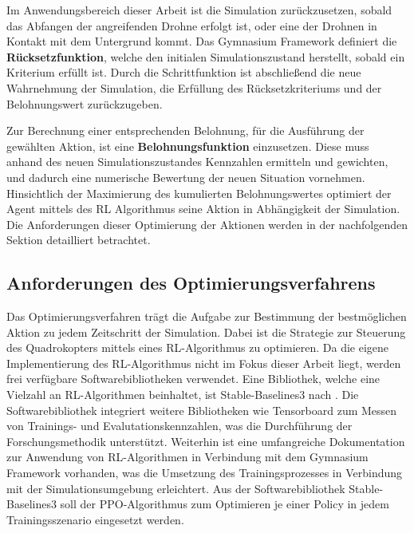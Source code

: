 Im Anwendungsbereich dieser Arbeit ist die Simulation zurückzusetzen, sobald das Abfangen der angreifenden Drohne erfolgt ist, oder eine der Drohnen in Kontakt mit dem Untergrund kommt.
Das Gymnasium Framework definiert die \textbf{Rücksetzfunktion}, welche den initialen Simulationszustand herstellt, sobald ein Kriterium erfüllt ist.
Durch die Schrittfunktion ist abschließend die neue Wahrnehmung der Simulation, die Erfüllung des Rücksetzkriteriums und der Belohnungswert zurückzugeben.

Zur Berechnung einer entsprechenden Belohnung, für die Ausführung der gewählten Aktion, ist eine \textbf{Belohnungsfunktion} einzusetzen.
Diese muss anhand des neuen Simulationszustandes Kennzahlen ermitteln und gewichten, und dadurch eine numerische Bewertung der neuen Situation vornehmen.
Hinsichtlich der Maximierung des kumulierten Belohnungswertes optimiert der Agent mittels des RL Algorithmus seine Aktion in Abhängigkeit der Simulation.
Die Anforderungen dieser Optimierung der Aktionen werden in der nachfolgenden Sektion detailliert betrachtet.

\subsection{Anforderungen des Optimierungsverfahrens}

Das Optimierungsverfahren trägt die Aufgabe zur Bestimmung der bestmöglichen Aktion zu jedem Zeitschritt der Simulation.
Dabei ist die Strategie zur Steuerung des Quadrokopters mittels eines RL-Algorithmus zu optimieren.
Da die eigene Implementierung des RL-Algorithmus nicht im Fokus dieser Arbeit liegt, werden frei verfügbare Softwarebibliotheken verwendet.
Eine Bibliothek, welche eine Vielzahl an RL-Algorithmen beinhaltet, ist Stable-Baselines3 nach \cite[]{Raffin.2021}.
Die Softwarebibliothek integriert weitere Bibliotheken wie Tensorboard zum Messen von Trainings- und Evalutationskennzahlen, was die Durchführung der Forschungsmethodik unterstützt.
Weiterhin ist eine umfangreiche Dokumentation zur Anwendung von RL-Algorithmen in Verbindung mit dem Gymnasium Framework vorhanden, was die Umsetzung des Trainingsprozesses in Verbindung mit der Simulationsumgebung erleichtert.
Aus der Softwarebibliothek Stable-Baselines3 soll der PPO-Algorithmus zum Optimieren je einer Policy in jedem Trainingsszenario eingesetzt werden. 

